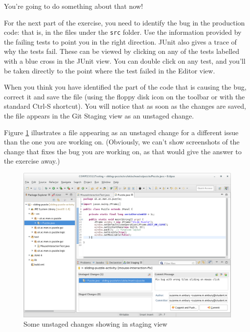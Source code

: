 \documentclass[
]{book}
\begin{document}
You're going to do something about that now!

For the next part of the exercise, you need to identify the bug in the production code: that is, in the files under the \texttt{src} folder. Use the information provided by the failing tests to point you in the right direction. JUnit also gives a trace of why the tests fail. These can be viewed by clicking on any of the tests labelled with a blue cross in the JUnit view. You can double click on any test, and you'll be taken directly to the point where the test failed in the Editor view.

When you think you have identified the part of the code that is causing the bug, correct it and save the file (using the floppy disk icon on the toolbar or with the standard Ctrl-S shortcut). You will notice that as soon as the changes are saved, the file appears in the Git Staging view as an unstaged change.

Figure \ref{fig:unstagedChangesShowingInStagingView-fig} illustrates a file appearing as an unstaged change for a different issue than the one you are working on. (Obviously, we can't show screenshots of the change that fixes the bug you are working on, as that would give the answer to the exercise away.)

\begin{figure}

{\centering \includegraphics[width=1\linewidth]{images/unstagedChangesShowingInStagingView} 

}

\caption{Some unstaged changes showing in staging view}\label{fig:unstagedChangesShowingInStagingView-fig}
\end{figure}
\end{document}

